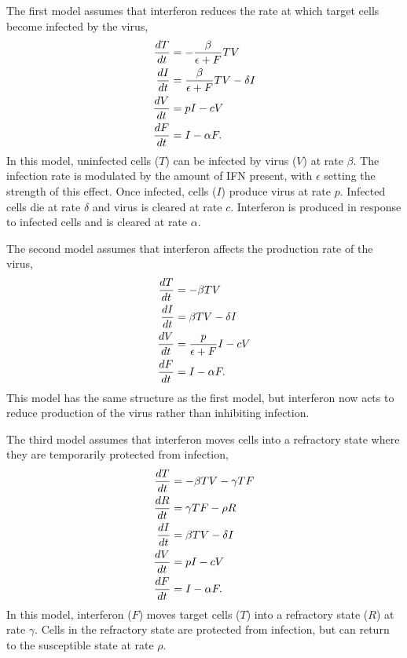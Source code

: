 \documentclass[12pt]{article}
\begin{document}
The first model assumes that interferon reduces the rate at which target cells become infected by the virus,
\begin{align}
\frac{dT}{dt} &= -\frac{\beta}{\epsilon + F}TV \notag\\
\frac{dI}{dt} &= \frac{\beta}{\epsilon + F}TV - \delta I\\
\frac{dV}{dt} &= pI - cV \notag\\
\frac{dF}{dt} &= I - \alpha F. \notag
\end{align}
In this model, uninfected cells ($T$) can be infected by virus ($V$) at rate $\beta$. The infection rate is modulated by the amount of IFN present, with $\epsilon$ setting the strength of this effect. Once infected, cells ($I$) produce virus at rate $p$. Infected cells die at rate $\delta$ and virus is cleared at rate $c$. Interferon is produced in response to infected cells and is cleared at rate $\alpha$.

The second model assumes that interferon affects the production rate of the virus,
\begin{align}
\frac{dT}{dt} &= -\beta TV \notag\\
\frac{dI}{dt} &= \beta TV - \delta I\\
\frac{dV}{dt} &= \frac{p}{\epsilon + F}I - cV\notag\\
\frac{dF}{dt} &= I - \alpha F.\notag
\end{align}
This model has the same structure as the first model, but interferon now acts to reduce production of the virus rather than inhibiting infection.

The third model assumes that interferon moves cells into a refractory state where they are temporarily protected from infection,
\begin{align}
\frac{dT}{dt} &= -\beta TV - \gamma TF \notag\\
\frac{dR}{dt} &= \gamma TF - \rho R \notag\\
\frac{dI}{dt} &= \beta TV - \delta I\\
\frac{dV}{dt} &= pI - cV \notag\\
\frac{dF}{dt} &= I - \alpha F.\notag
\end{align}
In this model, interferon ($F$) moves target cells ($T$) into a refractory state ($R$) at rate $\gamma$. Cells in the refractory state are protected from infection, but can return to the susceptible state at rate $\rho$. 

\end{document}
